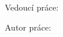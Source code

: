 \begin{titlepage}
	\centering

  \vfill

	{\LARGE \skola \par}
	{\Large \fakulta \par}

	\vfill

	{\huge\bfseries \nazev \par}
	{\Large \typPrace \par}

  \vfill

  {\Large Vedoucí práce: \vedouciPrace \par}
	{\Large Autor práce: \autor \par}

	\vspace{1.5cm}

	{\scshape\large \misto ~ \the\year \par}

  \vfill
\end{titlepage}
